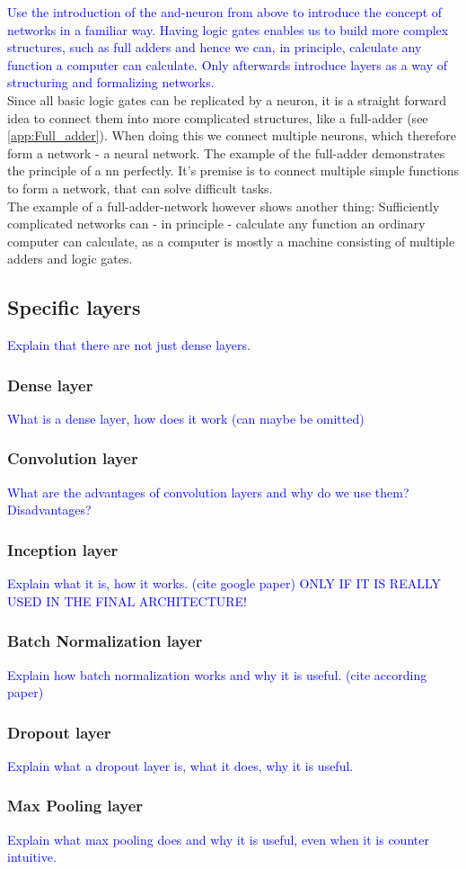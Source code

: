 \medskip
\textcolor{blue}{Use the introduction of the and-neuron from above to introduce the concept of networks in a familiar way. Having logic gates enables us to build more complex structures, such as full adders and hence we can, in principle, calculate any function a computer can calculate. Only afterwards introduce layers as a way of structuring and formalizing networks.}\\
\noindent Since all basic logic gates can be replicated by a neuron, it is a straight forward idea to connect them into more complicated structures, like a full-adder (see \autoref{app:Full_adder}). When doing this we connect multiple neurons, which therefore form a network - a neural network. The example of the full-adder demonstrates the principle of a \gls{nn} perfectly. It's premise is to connect multiple simple functions to form a network, that can solve difficult tasks.\\
The example of a full-adder-network however shows another thing: Sufficiently complicated networks can - in principle - calculate any function an ordinary computer can calculate, as a computer is mostly a machine consisting of multiple adders and logic gates. 

\subsection{Specific layers}
\textcolor{blue}{Explain that there are not just dense layers.}
\subsubsection{Dense layer}
\textcolor{blue}{What is a dense layer, how does it work (can maybe be omitted)}
\subsubsection{Convolution layer}
\textcolor{blue}{What are the advantages of convolution layers and why do we use them? Disadvantages?}
\subsubsection{Inception layer}
\textcolor{blue}{Explain what it is, how it works. (cite google paper) ONLY IF IT IS REALLY USED IN THE FINAL ARCHITECTURE!}
\subsubsection{Batch Normalization layer}
\textcolor{blue}{Explain how batch normalization works and why it is useful. (cite according paper)}
\subsubsection{Dropout layer}
\textcolor{blue}{Explain what a dropout layer is, what it does, why it is useful.}
\subsubsection{Max Pooling layer}
\textcolor{blue}{Explain what max pooling does and why it is useful, even when it is counter intuitive.}